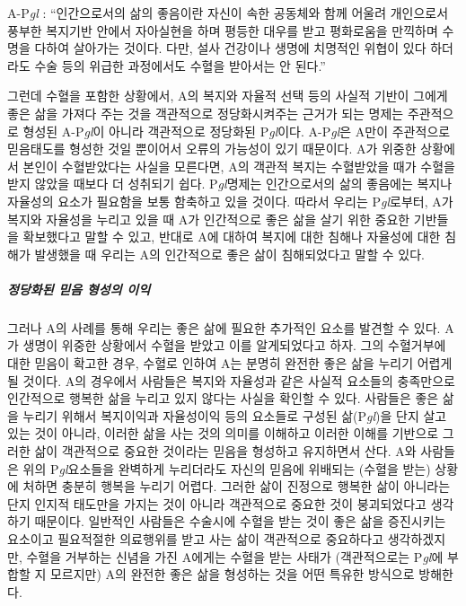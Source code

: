 A-P\emph{gl} : ``인간으로서의 삶의 좋음이란 자신이 속한 공동체와 함께 어울려 개인으로서 풍부한 복지기반 안에서 자아실현을 하며 평등한 대우를 받고 평화로움을 만끽하며 수명을 다하여 살아가는 것이다. 다만, 설사 건강이나 생명에 치명적인 위협이 있다 하더라도 수술 등의 위급한 과정에서도 수혈을 받아서는 안 된다.''

그런데 수혈을 포함한 상황에서, A의 복지와 자율적 선택 등의 사실적 기반이 그에게 좋은 삶을 가져다 주는 것을 객관적으로 정당화시켜주는 근거가 되는 명제는 주관적으로 형성된 A-P\emph{gl}이 아니라 객관적으로 정당화된 P\emph{gl}이다. A-P\emph{gl}은 A만이 주관적으로 믿음태도를 형성한 것일 뿐이어서 오류의 가능성이 있기 때문이다. A가 위중한 상황에서 본인이 수혈받았다는 사실을 모른다면, A의 객관적 복지는 수혈받았을 때가 수혈을 받지 않았을 때보다 더 성취되기 쉽다. P\emph{gl}명제는 인간으로서의 삶의 좋음에는 복지나 자율성의 요소가 필요함을 보통 함축하고 있을 것이다. 따라서 우리는 P\emph{gl}로부터, A가 복지와 자율성을 누리고 있을 때 A가 인간적으로 좋은 삶을 살기 위한 중요한 기반들을 확보했다고 말할 수 있고, 반대로 A에 대하여 복지에 대한 침해나 자율성에 대한 침해가 발생했을 때 우리는 A의 인간적으로 좋은 삶이 침해되었다고 말할 수 있다.

\subparagraph{정당화된 믿음 형성의 이익}

그러나 A의 사례를 통해 우리는 좋은 삶에 필요한 추가적인 요소를 발견할 수 있다. A가 생명이 위중한 상황에서 수혈을 받았고 이를 알게되었다고 하자. 그의 수혈거부에 대한 믿음이 확고한 경우, 수혈로 인하여 A는 분명히 완전한 좋은 삶을 누리기 어렵게 될 것이다. A의 경우에서 사람들은 복지와 자율성과 같은 사실적 요소들의 충족만으로 인간적으로 행복한 삶을 누리고 있지 않다는 사실을 확인할 수 있다. 사람들은 좋은 삶을 누리기 위해서 복지이익과 자율성이익 등의 요소들로 구성된 삶(P\emph{gl})을 단지 살고 있는 것이 아니라, 이러한 삶을 사는 것의 의미를 이해하고 이러한 이해를 기반으로 그러한 삶이 객관적으로 중요한 것이라는 믿음을 형성하고 유지하면서 산다. A와 사람들은 위의 P\emph{gl}요소들을 완벽하게 누리더라도 자신의 믿음에 위배되는 (수혈을 받는) 상황에 처하면 충분히 행복을 누리기 어렵다. 그러한 삶이 진정으로 행복한 삶이 아니라는 단지 인지적 태도만을 가지는 것이 아니라 객관적으로 중요한 것이 붕괴되었다고 생각하기 때문이다. 일반적인 사람들은 수술시에 수혈을 받는 것이 좋은 삶을 증진시키는 요소이고 필요적절한 의료행위를 받고 사는 삶이 객관적으로 중요하다고 생각하겠지만, 수혈을 거부하는 신념을 가진 A에게는 수혈을 받는 사태가 (객관적으로는 P\emph{gl}에 부합할 지 모르지만) A의 완전한 좋은 삶을 형성하는 것을 어떤 특유한 방식으로 방해한다.

